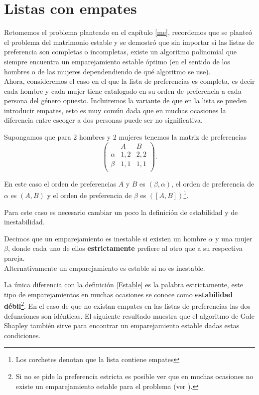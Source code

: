 \chapter{Listas con empates}

Retomemos el problema planteado en el capítulo \ref{me}, recordemos que se planteó el problema del matrimonio estable y se demostró que sin importar si las listas de preferencia son completas o incompletas, existe un algoritmo polinomial que siempre encuentra un emparejamiento estable óptimo (en el sentido de los hombres o de las mujeres dependendiendo de qué algoritmo se use). \\

Ahora, consideremos el caso en el que la lista de preferencias es completa, es decir cada hombre y cada mujer tiene catalogado en su orden de preferencia a cada persona del género opuesto. Incluiremos la variante de que en la lista se pueden introducir empates, esto es muy común dada que en muchas ocasiones la diferencia entre escoger a dos personas puede ser no significativa. 

\begin{eje}{\cite{Verde}}
\label{ejemplo empates}
Supongamos que para 2 hombres y 2 mujeres tenemos la matriz de preferencias 
$$\begin{pmatrix}
& A & B \\
\alpha & 1,2 & 2,2 \\
\beta & 1,1 & 1,1\\
\end{pmatrix}.$$

En este caso el orden de preferencias $A$ y $B$ es $(\beta, \alpha)$, el orden de preferencia de $\alpha$ es $(A,B)$ y el orden de preferencia de $\beta$ es $([A,B])$\footnote{Los corchetes denotan que la lista contiene empates}.
\end{eje}

Para este caso es necesario cambiar un poco la definición de estabilidad y de inestabilidad. 

\begin{dfn}{\cite{Verde}}
\label{estricto}
Decimos que un emparejamiento es inestable si existen un hombre $\alpha$ y una mujer $\beta$, donde cada uno de ellos \textbf{estrictamente} prefiere al otro que a su respectiva pareja. \\
Alternativamente un emparejamiento es estable si no es inestable.
\end{dfn}

La única diferencia con la definición \ref{Estable} es la palabra estrictamente, este tipo de emparejamientos en muchas ocasiones se conoce como \textbf{estabilidad débil}\footnote{Si no se pide la preferencia estricta es posible ver que en muchas ocasiones no existe un emparejamiento estable para el problema (ver \cite{Verde}).}. En el caso de que no existan empates en las listas de preferencias las dos defunciones son idénticas. El siguiente resultado muestra que el algoritmo de Gale Shapley también sirve para encontrar un emparejamiento estable dadas estas condiciones.

